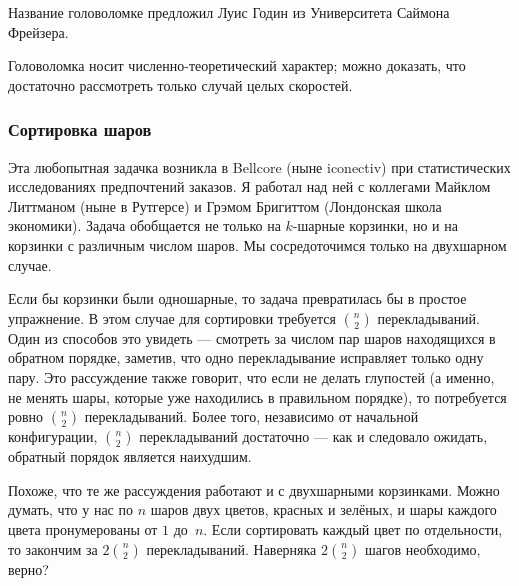 \medskip

Название головоломке предложил Луис Годин из Университета Саймона Фрейзера.

Головоломка носит численно-теоретический характер;
можно доказать, что достаточно рассмотреть только случай целых скоростей.

\subsubsection*{Сортировка шаров}

Эта любопытная задачка возникла в Bellcore (ныне iconectiv) при статистических исследованиях предпочтений заказов.
Я работал над ней с коллегами Майклом Литтманом (ныне в Рутгерсе) и Грэмом Бригиттом (Лондонская школа экономики).
Задача обобщается не только на $k$-шарные корзинки, но и на корзинки с различным числом шаров.
Мы сосредоточимся только на двухшарном случае.

\medskip

Если бы корзинки были одношарные, то задача превратилась бы в простое упражнение.
В этом случае  для сортировки требуется $\binom{n}{2}$ перекладываний.
Один из способов это увидеть --- смотреть за числом пар шаров находящихся в обратном порядке, заметив, что одно перекладывание исправляет только одну пару.
Это рассуждение также говорит, что если не делать глупостей (а именно, не менять шары, которые уже находились в правильном порядке), то потребуется ровно $\binom{n}{2}$ перекладываний.
Более того, независимо от начальной конфигурации, $\binom{n}{2}$ перекладываний достаточно --- как и следовало ожидать, обратный порядок является наихудшим.

\medskip

Похоже, что те же рассуждения работают и с двухшарными корзинками.
Можно думать, что у нас по $n$ шаров двух цветов, красных и зелёных, и шары каждого цвета пронумерованы от $1$ до~$n$.
Если сортировать каждый цвет по отдельности, то закончим за $2\binom{n}{2}$ перекладываний.
Наверняка $2\binom{n}{2}$ шагов необходимо, верно?

